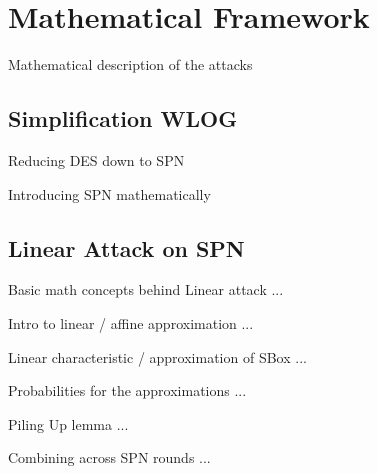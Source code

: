 \documentclass[9pt]{beamer}
\begin{document}
\section{Mathematical Framework}
\begin{frame}
Mathematical description of the attacks

\end{frame}

\subsection{Simplification WLOG}
\begin{frame}
Reducing DES down to SPN

\end{frame}

\begin{frame}
Introducing SPN mathematically

\end{frame}

\subsection{Linear Attack on SPN}
\begin{frame}
Basic math concepts behind Linear attack ...

\end{frame}

\begin{frame}
Intro to linear / affine approximation ... 

\end{frame}

\begin{frame}
Linear characteristic / approximation of SBox ...

\end{frame}

\begin{frame}
Probabilities for the approximations ...

\end{frame}

\begin{frame}
Piling Up lemma ...

\end{frame}

\begin{frame}
Combining across SPN rounds ... 

\end{frame}
\end{document}
